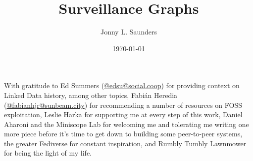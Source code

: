 \documentclass{article}
\title{Surveillance Graphs}
\author{Jonny L. Saunders}
\date{\today}
\newenvironment{acknowledgements}{%
\vspace{1em}
\par\vspace*{\fill}
\begin{mdframed}[
     linewidth=1pt,
     linecolor=black,
     leftline=false,bottomline=false,rightline=false,
     innerrightmargin=0pt,innertopmargin=1em,innerbottommargin=0pt,
     innerleftmargin=1em,%
     skipabove=.5\baselineskip
   ]
}{%
\end{mdframed}\newpage
}
\begin{document}

\maketitle

\tableofcontents

\begin{acknowledgements}
With gratitude to Ed Summers (\href{https://social.coop/@edsu}{@edsu@social.coop}) for providing context on Linked Data history, among other topics, Fabián Heredia (\href{https://sunbeam.city/@fabianhjr}{@fabianhjr@sunbeam.city}) for recommending a number of resources on FOSS exploitation, Leslie Harka for supporting me at every step of this work, Daniel Aharoni and the Miniscope Lab for welcoming me and tolerating me writing one more piece before it's time to get down to building some peer-to-peer systems, the greater Fediverse for constant inspiration, and Rumbly Tumbly Lawnmower for being the light of my life.
\end{acknowledgements}


\restoregeometry
\clearpage
\end{document}
